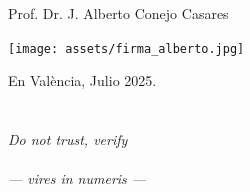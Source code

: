 \documentclass[11pt]{book}
\theoremstyle{definition}
\begin{document}
\vspace{1cm}


\begin{center}
Prof. Dr. J. Alberto Conejo Casares

\texttt{[image: assets/firma\_alberto.jpg]}

En València, Julio 2025.

\end{center}

\vfill

\clearpage
\thispagestyle{empty}
\null
\clearpage


\chapter*{}
\vspace*{1cm}
\begin{flushright}
\textit{Do not trust, verify ~~\\ ~ \\ --- vires in numeris ---}
\end{flushright}

\clearpage
\thispagestyle{empty}
\null
\clearpage




\tableofcontents
\vfill
\pagebreak
\thispagestyle{almostempty}


\pagestyle{plain}


\clearpage
\thispagestyle{empty}
\null
\clearpage



\clearpage
\thispagestyle{empty}
\null
\clearpage




\clearpage
\thispagestyle{empty}
\null
\clearpage





\clearpage
\thispagestyle{empty}
\null
\clearpage


\vfill



\clearpage
\thispagestyle{empty}
\null
\clearpage



\vfill
  

\end{document}
